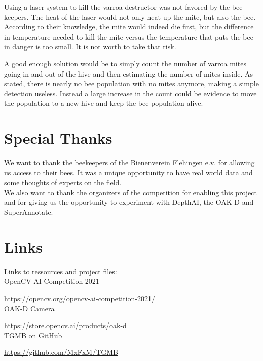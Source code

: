 \documentclass[a4paper,titlepage]{article}
\begin{document}
Using a laser system to kill the varroa destructor was not favored by the bee keepers.
The heat of the laser would not only heat up the mite, but also the bee.
According to their knowledge, the mite would indeed die first, but the difference in temperature needed to kill the mite versus the temperature that puts the bee in danger is too small.
It is not worth to take that risk.

A good enough solution would be to simply count the number of varroa mites going in and out of the hive and then estimating the number of mites inside.
As stated, there is nearly no bee population with no mites anymore, making a simple detection useless.
Instead a large increase in the count could be evidence to move the population to a new hive and keep the bee population alive.

\newpage
\section{Special Thanks}

We want to thank the beekeepers of the Bienenverein Flehingen e.v. for allowing us access to their bees.
It was a unique opportunity to have real world data and some thoughts of experts on the field.\\

We also want to thank the organizers of the competition for enabling this project and for giving us the opportunity to experiment with DepthAI, the OAK-D and SuperAnnotate.

\newpage
\section{Links}

Links to ressources and project files: \\

OpenCV AI Competition 2021

\href{https://opencv.org/opencv-ai-competition-2021/}{https://opencv.org/opencv-ai-competition-2021/} \\

OAK-D Camera

\href{https://store.opencv.ai/products/oak-d}{https://store.opencv.ai/products/oak-d} \\

TGMB on GitHub

\href{https://github.com/MxFxM/TGMB}{https://github.com/MxFxM/TGMB} \\
\end{document}
